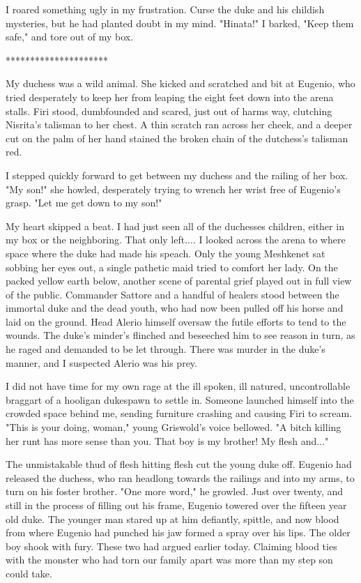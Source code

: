 \documentclass{article}
\begin{document}
I roared something ugly in my frustration. Curse the duke and his childish mysteries, but he had planted doubt in my mind. "Hinata!" I barked, "Keep them safe," and tore out of my box.

*********************

My duchess was a wild animal. She kicked and scratched and bit at Eugenio, who tried desperately to keep her from leaping the eight feet down into the arena stalls. Firi stood, dumbfounded and scared, just out of harms way, clutching Nisrita's talisman to her chest. A thin scratch ran across her cheek, and a deeper cut on the palm of her hand stained the broken chain of the dutchess's talisman red.

I stepped quickly forward to get between my duchess and the railing of her box. "My son!" she howled, desperately trying to wrench her wrist free of Eugenio's grasp. "Let me get down to my son!"

My heart skipped a beat. I had just seen all of the duchesses children, either in my box or the neighboring. That only left.... I looked across the arena to where space where the duke had made his speach. Only the young Meshkenet sat sobbing her eyes out, a single pathetic maid tried to comfort her lady. On the packed yellow earth below, another scene of parental grief played out in full view of the public. Commander Sattore and a handful of healers stood between the immortal duke and the dead youth, who had now been pulled off his horse and laid on the ground. Head Alerio himself oversaw the futile efforts to tend to the wounds. The duke's minder's flinched and beseeched him to see reason in turn, as he raged and demanded to be let through. There was murder in the duke's manner, and I suspected Alerio was his prey.

I did not have time for my own rage at the ill spoken, ill natured, uncontrollable braggart of a hooligan dukespawn to settle in. Someone launched himself into the crowded space behind me, sending furniture crashing and causing Firi to scream. "This is your doing, woman," young Griswold's voice bellowed. "A bitch killing her runt has more sense than you. That boy is my brother! My flesh and..."

The unmistakable thud of flesh hitting flesh cut the young duke off. Eugenio had released the duchess, who ran headlong towards the railings and into my arms, to turn on his foster brother. "One more word," he growled. Just over twenty, and still in the process of filling out his frame, Eugenio towered over the fifteen year old duke. The younger man stared up at him defiantly, spittle, and now blood from where Eugenio had punched his jaw formed a spray over his lips. The older boy shook with fury. These two had argued earlier today. Claiming blood ties with the monster who had torn our family apart was more than my step son could take.
\end{document}
